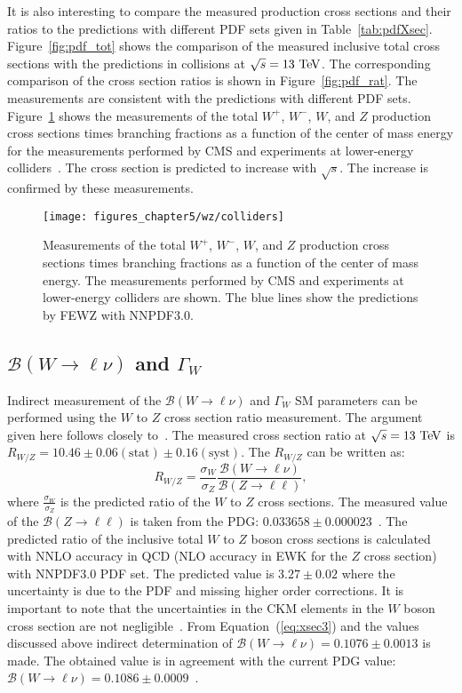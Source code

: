 It is also interesting to compare the measured production cross sections and their ratios to the predictions with different PDF sets given in Table~\ref{tab:pdfXsec}. Figure~\ref{fig:pdf_tot} shows the comparison of the measured inclusive total cross sections with the predictions in collisions at $\sqrt{s}=13~\mathrm{Te\kern -0.1em V}$. The corresponding comparison of the cross section ratios is shown in Figure~\ref{fig:pdf_rat}. The measurements are consistent with the predictions with different PDF sets. Figure~\ref{fig:collider} shows the measurements of the total $W^+$, $W^-$, $W$, and $Z$ production cross sections times branching fractions as a function of the center of mass energy for the measurements performed by CMS and experiments at lower-energy colliders~\cite{UA1-wz, UA2-wz, CDF-wz-e, CDF-z-m, CDF-wz, D0-w}. The cross section is predicted to increase with $\sqrt{s}$. The increase is confirmed by these measurements.
\begin{figure}[tbh]
\centering
\texttt{[image: figures\_chapter5/wz/colliders]}
\caption{Measurements of the total $W^+$, $W^-$, $W$, and $Z$ production cross sections times branching fractions as a function of the center of mass energy. The measurements performed by CMS and experiments at lower-energy colliders are shown. The blue lines show the predictions by FEWZ with NNPDF3.0.}
\label{fig:collider}
\end{figure}

\subsection{$\mathcal{B}(W \rightarrow \ell \nu)$ and $\Gamma_W$}

Indirect measurement of the $\mathcal{B}(W \rightarrow \ell \nu)$  and $\Gamma_W$ SM parameters can be performed using the $W$ to $Z$ cross section ratio measurement. The argument given here follows closely to~\cite{CMS:2011aa}. The measured cross section ratio at $\sqrt{s}=13~\mathrm{Te\kern -0.1em V}$ is $R_{W/Z}=10.46 \pm 0.06 (\mathrm{stat}) \pm 0.16(\mathrm{syst})$. The $R_{W/Z}$ can be written as:
\begin{equation} \label{eq:xsec3}
R_{W/Z} = \frac{\sigma_W}{\sigma_Z} \frac{\mathcal{B}(W\rightarrow \ell\nu)}{\mathcal{B}(Z\rightarrow \ell\ell)},
\end{equation}
where $\frac{\sigma_W}{\sigma_Z}$ is the predicted ratio of the $W$ to $Z$ cross sections. The measured value of the  $\mathcal{B}(Z\rightarrow \ell\ell)$ is taken from the PDG: $0.033658 \pm 0.000023$~\cite{Agashe:2014kda}. The predicted ratio of the inclusive total $W$ to $Z$ boson cross sections is calculated with NNLO accuracy in QCD (NLO accuracy in EWK for the $Z$ cross section) with NNPDF3.0 PDF set. The predicted value is $3.27\pm0.02$ where the uncertainty is due to the PDF and missing higher order corrections. It is important to note that the uncertainties in the CKM elements in the $W$ boson cross section are not negligible~\cite{Renton:2008ub}. From Equation~(\ref{eq:xsec3}) and the values discussed above indirect determination of  $\mathcal{B}(W \rightarrow \ell \nu) = 0.1076 \pm 0.0013$ is made. The obtained value is in agreement with the current PDG value: $\mathcal{B}(W \rightarrow \ell \nu) = 0.1086 \pm 0.0009$~\cite{Agashe:2014kda}. 

